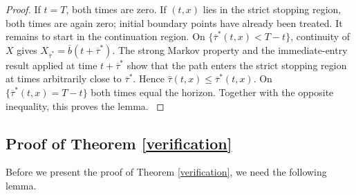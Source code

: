 \documentclass[a4paper,11pt]{amsart}
\numberwithin{equation}{section}
\newcommand{\blue}[1]{{\color{black}#1}}
\begin{document}
{\begin{proof}
{\blue{If $t=T$, both times are zero. If $(t,x)$ lies in the strict stopping region, both times are again zero; initial boundary points have already been treated. It remains to start in the continuation region.} On $\{\overline\tau^\ast(t,x)<T-t\}$, continuity of $X$ gives $X_{\overline\tau^\ast}=\overline b(t+\overline\tau^\ast)$. The strong Markov property and the immediate-entry result applied at time $t+\overline\tau^\ast$ show that the path enters the strict stopping region at times arbitrarily close to $\overline\tau^\ast$. Hence $\widehat\tau(t,x)\leq\overline\tau^\ast(t,x)$. On $\{\overline\tau^\ast(t,x)=T-t\}$ both times equal the horizon. Together with the opposite inequality, this proves the lemma.
}
\end{proof}


 \vspace{-\baselineskip}

\subsection{Proof of Theorem \ref{verification} }\label{proofsolution}
Before we present the proof of Theorem \ref{verification}, we need the following lemma.

}
\end{document}
